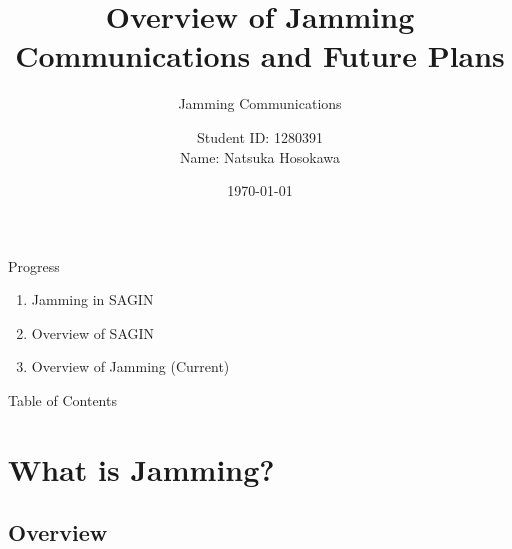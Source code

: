 \documentclass[11pt, aspectratio=169]{beamer}
\title{Overview of Jamming Communications and Future Plans}
\subtitle{Jamming Communications}
\author{Student ID: 1280391 \\ Name: Natsuka Hosokawa}
\institute{Kochi University of Technology}
\date{\today}
\begin{document}
\usetikzlibrary{decorations.pathmorphing}

\begin{frame}
  \titlepage
\end{frame}

\begin{frame}{Progress}
  \begin{enumerate}[1]
    \item Jamming in SAGIN
    \item Overview of SAGIN
    \item Overview of Jamming (Current)
  \end{enumerate}
\end{frame}

\begin{frame}{Table of Contents}
  \tableofcontents
\end{frame}


\section{What is Jamming?}
\subsection{Overview}
\end{document}
